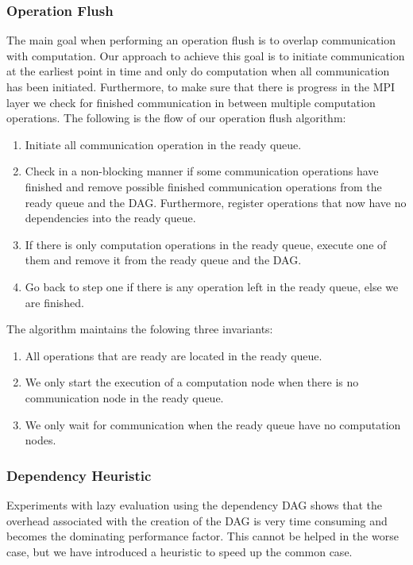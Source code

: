 \documentclass[preprint]{../PGAS10/sigplanconf}
\begin{document}
\subsubsection{Operation Flush}
The main goal when performing an operation flush is to overlap communication with computation. Our approach to achieve this goal is to initiate communication at the earliest point in time and only do computation when all communication has been initiated. Furthermore, to make sure that there is progress in the MPI layer we check for finished communication in between multiple computation operations. The following is the flow of our operation flush algorithm:
\begin{enumerate}
\item Initiate all communication operation in the ready queue.
\item Check in a non-blocking manner if some communication operations have finished and remove possible finished communication operations from the ready queue and the DAG. Furthermore, register operations that now have no dependencies into the ready queue.
\item If there is only computation operations in the ready queue, execute one of them and remove it from the ready queue and the DAG.
\item Go back to step one if there is any operation left in the ready queue, else we are finished.
\end{enumerate}
The algorithm maintains the folowing three invariants:
\begin{enumerate}
\item All operations that are ready are located in the ready queue.
\item We only start the execution of a computation node when there is no communication node in the ready queue.
\item We only wait for communication when the ready queue have no computation nodes.
\end{enumerate}



\subsubsection{Dependency Heuristic}
Experiments with lazy evaluation using the dependency DAG shows that the overhead associated with the creation of the DAG is very time consuming and becomes the dominating performance factor. This cannot be helped in the worse case, but we have introduced a heuristic to speed up the common case. 
\end{document}

